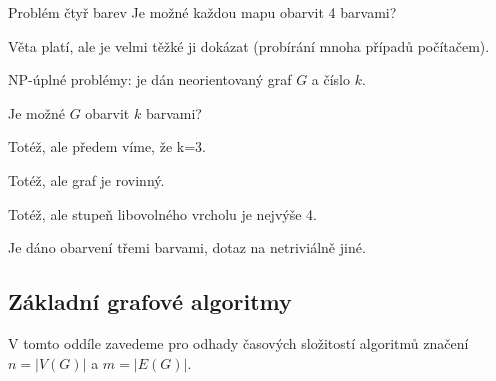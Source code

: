 \begin{vetaN}{Problém čtyř barev}
Je možné každou mapu obarvit 4 barvami?

\medskip
\begin{dukaz}
Věta platí, ale je velmi těžké ji dokázat (probírání mnoha případů počítačem).
\end{dukaz}
\end{vetaN}

\begin{poznamka}
NP-úplné problémy: je dán neorientovaný graf $G$ a číslo $k.$
\begin{penumerate}
\item Je možné $G$ obarvit $k$ barvami?
\item Totéž, ale předem víme, že k=3.
\item Totéž, ale graf je rovinný.
\item Totéž, ale stupeň libovolného vrcholu je nejvýše 4.
\item Je dáno obarvení třemi barvami, dotaz na netriviálně jiné.
\end{penumerate}
\end{poznamka}


\subsection{Základní grafové algoritmy}


V tomto oddíle zavedeme pro odhady časových složitostí algoritmů značení $n=|V(G)|$ a $m=|E(G)|.$

